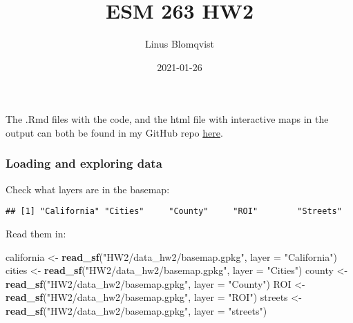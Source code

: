 \documentclass[
]{article}
\title{ESM 263 HW2}
\author{Linus Blomqvist}
\date{2021-01-26}
\newenvironment{Shaded}{\begin{snugshade}}{\end{snugshade}}
\newcommand{\DataTypeTok}[1]{\textcolor[rgb]{0.13,0.29,0.53}{#1}}
\newcommand{\KeywordTok}[1]{\textcolor[rgb]{0.13,0.29,0.53}{\textbf{#1}}}
\newcommand{\NormalTok}[1]{#1}
\newcommand{\OperatorTok}[1]{\textcolor[rgb]{0.81,0.36,0.00}{\textbf{#1}}}
\newcommand{\StringTok}[1]{\textcolor[rgb]{0.31,0.60,0.02}{#1}}
\begin{document}
\maketitle

The .Rmd files with the code, and the html file with interactive maps in
the output can both be found in my GitHub repo
\href{https://github.com/linusblomqvist/esm-263/tree/main/HW2}{here}.

\hypertarget{loading-and-exploring-data}{%
\subsubsection{Loading and exploring
data}\label{loading-and-exploring-data}}

Check what layers are in the basemap:

\begin{Shaded}
\end{Shaded}

\begin{verbatim}
## [1] "California" "Cities"     "County"     "ROI"        "Streets"
\end{verbatim}

Read them in:

\begin{Shaded}
\begin{Highlighting}[]
\NormalTok{california <-}\StringTok{ }\KeywordTok{read_sf}\NormalTok{(}\StringTok{"HW2/data_hw2/basemap.gpkg"}\NormalTok{, }\DataTypeTok{layer =} \StringTok{"California"}\NormalTok{)}
\NormalTok{cities <-}\StringTok{ }\KeywordTok{read_sf}\NormalTok{(}\StringTok{"HW2/data_hw2/basemap.gpkg"}\NormalTok{, }\DataTypeTok{layer =} \StringTok{"Cities"}\NormalTok{)}
\NormalTok{county <-}\StringTok{ }\KeywordTok{read_sf}\NormalTok{(}\StringTok{"HW2/data_hw2/basemap.gpkg"}\NormalTok{, }\DataTypeTok{layer =} \StringTok{"County"}\NormalTok{)}
\NormalTok{ROI <-}\StringTok{ }\KeywordTok{read_sf}\NormalTok{(}\StringTok{"HW2/data_hw2/basemap.gpkg"}\NormalTok{, }\DataTypeTok{layer =} \StringTok{"ROI"}\NormalTok{)}
\NormalTok{streets <-}\StringTok{ }\KeywordTok{read_sf}\NormalTok{(}\StringTok{"HW2/data_hw2/basemap.gpkg"}\NormalTok{, }\DataTypeTok{layer =} \StringTok{"streets"}\NormalTok{)}
\end{Highlighting}
\end{Shaded}
\end{document}
